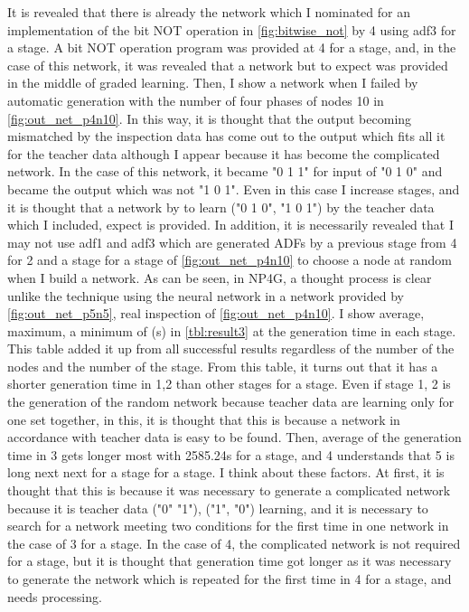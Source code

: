 \documentclass{article}
\begin{document}
It is revealed that there is already the network which I nominated for an implementation of the bit NOT operation in \ref{fig:bitwise_not} by 4 using adf3 for a stage.
A bit NOT operation program was provided at 4 for a stage, and, in the case of this network, it was revealed that a network but to expect was provided in the middle of graded learning.
Then, I show a network when I failed by automatic generation with the number of four phases of nodes 10 in \ref{fig:out_net_p4n10}.
In this way, it is thought that the output becoming mismatched by the inspection data has come out to the output which fits all it for the teacher data although I appear because it has become the complicated network.
In the case of this network, it became "0 1 1" for input of "0 1 0" and became the output which was not "1 0 1".
Even in this case I increase stages, and it is thought that a network by to learn ("0 1 0", "1 0 1") by the teacher data which I included, expect is provided.
In addition, it is necessarily revealed that I may not use adf1 and adf3 which are generated ADFs by a previous stage from 4 for 2 and a stage for a stage of \ref{fig:out_net_p4n10} to choose a node at random when I build a network.
As can be seen, in NP4G, a thought process is clear unlike the technique using the neural network in a network provided by \ref{fig:out_net_p5n5}, real inspection of \ref{fig:out_net_p4n10}.
I show average, maximum, a minimum of (s) in \ref{tbl:result3} at the generation time in each stage.
This table added it up from all successful results regardless of the number of the nodes and the number of the stage.
From this table, it turns out that it has a shorter generation time in 1,2 than other stages for a stage.
Even if stage 1, 2 is the generation of the random network because teacher data are learning only for one set together, in this, it is thought that this is because a network in accordance with teacher data is easy to be found.
Then, average of the generation time in 3 gets longer most with 2585.24s for a stage, and 4 understands that 5 is long next next for a stage for a stage.
I think about these factors.
At first, it is thought that this is because it was necessary to generate a complicated network because it is teacher data ("0" "1"), ("1", "0") learning, and it is necessary to search for a network meeting two conditions for the first time in one network in the case of 3 for a stage.
In the case of 4, the complicated network is not required for a stage, but it is thought that generation time got longer as it was necessary to generate the network which is repeated for the first time in 4 for a stage, and needs processing.
\end{document}
